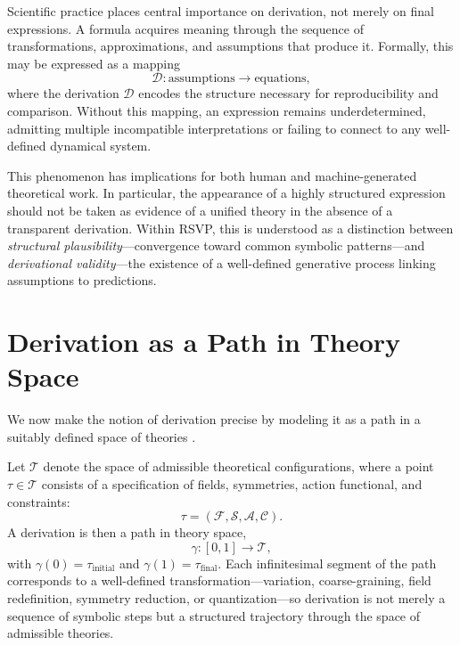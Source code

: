 \documentclass[12pt,a4paper]{article}
\theoremstyle{plain}
\theoremstyle{definition}
\theoremstyle{remark}
\begin{document}
Scientific practice places central importance on derivation, not merely
on final expressions. A formula acquires meaning through the sequence
of transformations, approximations, and assumptions that produce it.
Formally, this may be expressed as a mapping
\begin{equation}
\mathcal{D} : \text{assumptions} \longrightarrow \text{equations},
\end{equation}
where the derivation $\mathcal{D}$ encodes the structure necessary for
reproducibility and comparison. Without this mapping, an expression
remains underdetermined, admitting multiple incompatible
interpretations or failing to connect to any well-defined dynamical
system.

This phenomenon has implications for both human and machine-generated
theoretical work. In particular, the appearance of a highly structured
expression should not be taken as evidence of a unified theory in the
absence of a transparent derivation. Within RSVP, this is understood
as a distinction between \emph{structural plausibility}---convergence
toward common symbolic patterns---and \emph{derivational validity}---the
existence of a well-defined generative process linking assumptions to
predictions.

\section{Derivation as a Path in Theory Space}
\label{sec:derivationpath}

We now make the notion of derivation precise by modeling it as a path
in a suitably defined space of theories \cite{Zamolodchikov1986,
PannellStergiou2025}.

Let $\mathcal{T}$ denote the space of admissible theoretical
configurations, where a point $\tau \in \mathcal{T}$ consists of a
specification of fields, symmetries, action functional, and
constraints:
\begin{equation}
\tau = (\mathcal{F}, \mathcal{S}, \mathcal{A}, \mathcal{C}).
\end{equation}
A derivation is then a path in theory space,
\begin{equation}
\gamma : [0,1] \rightarrow \mathcal{T},
\end{equation}
with $\gamma(0) = \tau_{\mathrm{initial}}$ and $\gamma(1) =
\tau_{\mathrm{final}}$. Each infinitesimal segment of the path
corresponds to a well-defined transformation---variation, coarse-graining,
field redefinition, symmetry reduction, or quantization---so derivation
is not merely a sequence of symbolic steps but a structured trajectory
through the space of admissible theories.
\end{document}
